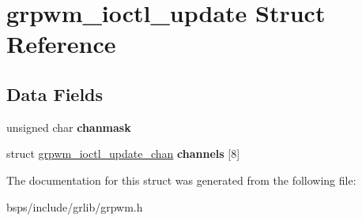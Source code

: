 \hypertarget{structgrpwm__ioctl__update}{}\section{grpwm\+\_\+ioctl\+\_\+update Struct Reference}
\label{structgrpwm__ioctl__update}
\subsection*{Data Fields}
\begin{DoxyCompactItemize}
\item 
\mbox{\label{structgrpwm__ioctl__update_a34e953682ceb2ea87086bfdc450e75e3}} 
unsigned char {\bfseries chanmask}
\item 
\mbox{\label{structgrpwm__ioctl__update_afc4ae645f0403c3e80018790d322f755}} 
struct \mbox{\hyperlink{structgrpwm__ioctl__update__chan}{grpwm\+\_\+ioctl\+\_\+update\+\_\+chan}} {\bfseries channels} \mbox{[}8\mbox{]}
\end{DoxyCompactItemize}


The documentation for this struct was generated from the following file\+:\begin{DoxyCompactItemize}
\item 
bsps/include/grlib/grpwm.\+h\end{DoxyCompactItemize}
